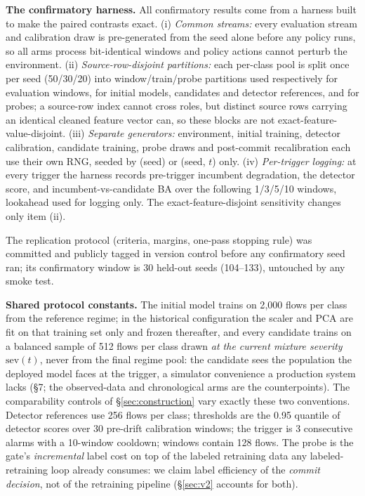 \documentclass[journal]{IEEEtran}
\begin{document}
\textbf{The confirmatory harness.} All confirmatory results come from a harness built to make the paired contrasts exact. (i) \emph{Common streams:} every evaluation stream and calibration draw is pre-generated from the seed alone before any policy runs, so all arms process bit-identical windows and policy actions cannot perturb the environment. (ii) \emph{Source-row-disjoint partitions:} each per-class pool is split once per seed (50/30/20) into window/train/probe partitions used respectively for evaluation windows, for initial models, candidates and detector references, and for probes; a source-row index cannot cross roles, but distinct source rows carrying an identical cleaned feature vector can, so these blocks are not exact-feature-value-disjoint. (iii) \emph{Separate generators:} environment, initial training, detector calibration, candidate training, probe draws and post-commit recalibration each use their own RNG, seeded by (seed) or (seed, $t$) only. (iv) \emph{Per-trigger logging:} at every trigger the harness records pre-trigger incumbent degradation, the detector score, and incumbent-vs-candidate BA over the following 1/3/5/10 windows, lookahead used for logging only. The exact-feature-disjoint sensitivity changes only item (ii).

The replication protocol (criteria, margins, one-pass stopping rule) was committed and publicly tagged in version control before any confirmatory seed ran; its confirmatory window is 30 held-out seeds (104--133), untouched by any smoke test.


\textbf{Shared protocol constants.} The initial model trains on 2{,}000 flows per class from the reference regime; in the historical configuration the scaler and PCA are fit on that training set only and frozen thereafter, and every candidate trains on a balanced sample of 512 flows per class drawn \emph{at the current mixture severity} $\mathrm{sev}(t)$, never from the final regime pool: the candidate sees the population the deployed model faces at the trigger, a simulator convenience a production system lacks (\S7; the observed-data and chronological arms are the counterpoints). The comparability controls of \S\ref{sec:construction} vary exactly these two conventions. Detector references use 256 flows per class; thresholds are the 0.95 quantile of detector scores over 30 pre-drift calibration windows; the trigger is 3 consecutive alarms with a 10-window cooldown; windows contain 128 flows. The probe is the gate's \emph{incremental} label cost on top of the labeled retraining data any labeled-retraining loop already consumes: we claim label efficiency of the \emph{commit decision}, not of the retraining pipeline (\S\ref{sec:v2} accounts for both).
\end{document}

